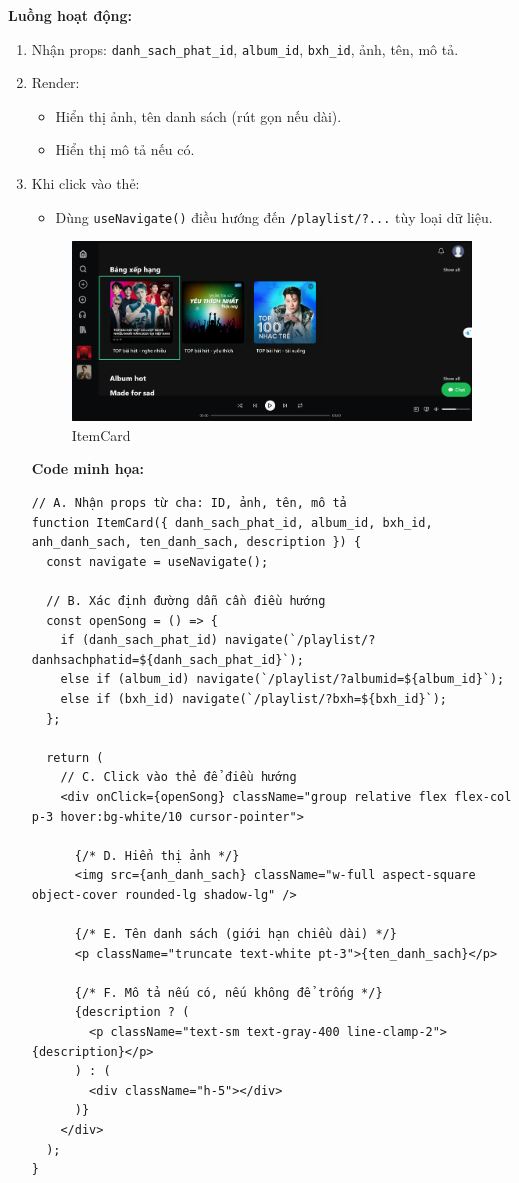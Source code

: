 \textbf{Luồng hoạt động:}
\begin{enumerate}
  \item Nhận props: \texttt{danh\_sach\_phat\_id}, \texttt{album\_id}, \texttt{bxh\_id}, ảnh, tên, mô tả.
  \item Render:
  \begin{itemize}
    \item Hiển thị ảnh, tên danh sách (rút gọn nếu dài).
    \item Hiển thị mô tả nếu có.
  \end{itemize}
  \item Khi click vào thẻ:
  \begin{itemize}
    \item Dùng \texttt{useNavigate()} điều hướng đến \texttt{/playlist/?...} tùy loại dữ liệu.
  \end{itemize}
  \begin{figure}[H]
    \centering
    \includegraphics[width=1\textwidth]{imgs/trienkhaife/itemcard.png}
    \caption{ItemCard}
  \end{figure}
  \textbf{Code minh họa:}

\begin{verbatim}
// A. Nhận props từ cha: ID, ảnh, tên, mô tả
function ItemCard({ danh_sach_phat_id, album_id, bxh_id, anh_danh_sach, ten_danh_sach, description }) {
  const navigate = useNavigate();

  // B. Xác định đường dẫn cần điều hướng
  const openSong = () => {
    if (danh_sach_phat_id) navigate(`/playlist/?danhsachphatid=${danh_sach_phat_id}`);
    else if (album_id) navigate(`/playlist/?albumid=${album_id}`);
    else if (bxh_id) navigate(`/playlist/?bxh=${bxh_id}`);
  };

  return (
    // C. Click vào thẻ để điều hướng
    <div onClick={openSong} className="group relative flex flex-col p-3 hover:bg-white/10 cursor-pointer">

      {/* D. Hiển thị ảnh */}
      <img src={anh_danh_sach} className="w-full aspect-square object-cover rounded-lg shadow-lg" />

      {/* E. Tên danh sách (giới hạn chiều dài) */}
      <p className="truncate text-white pt-3">{ten_danh_sach}</p>

      {/* F. Mô tả nếu có, nếu không để trống */}
      {description ? (
        <p className="text-sm text-gray-400 line-clamp-2">{description}</p>
      ) : (
        <div className="h-5"></div>
      )}
    </div>
  );
}
\end{verbatim}

\end{enumerate}

